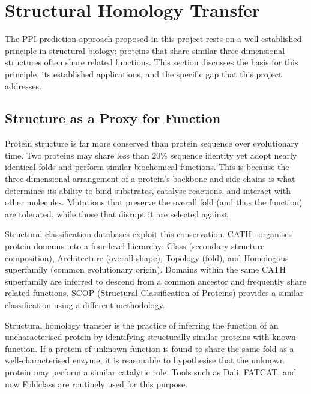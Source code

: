 \section{Structural Homology Transfer}
\label{sec:bg-homology}

The PPI prediction approach proposed in this project rests on a well-established principle in structural biology: proteins that share similar three-dimensional structures often share related functions.
This section discusses the basis for this principle, its established applications, and the specific gap that this project addresses.

\subsection{Structure as a Proxy for Function}

Protein structure is far more conserved than protein sequence over evolutionary time.
Two proteins may share less than 20\% sequence identity yet adopt nearly identical folds and perform similar biochemical functions.
This is because the three-dimensional arrangement of a protein's backbone and side chains is what determines its ability to bind substrates, catalyse reactions, and interact with other molecules.
Mutations that preserve the overall fold (and thus the function) are tolerated, while those that disrupt it are selected against.

Structural classification databases exploit this conservation.
CATH~\cite{ted_dataset} organises protein domains into a four-level hierarchy: Class (secondary structure composition), Architecture (overall shape), Topology (fold), and Homologous superfamily (common evolutionary origin).
Domains within the same CATH superfamily are inferred to descend from a common ancestor and frequently share related functions.
SCOP (Structural Classification of Proteins) provides a similar classification using a different methodology.

Structural homology transfer is the practice of inferring the function of an uncharacterised protein by identifying structurally similar proteins with known function.
If a protein of unknown function is found to share the same fold as a well-characterised enzyme, it is reasonable to hypothesise that the unknown protein may perform a similar catalytic role.
Tools such as Dali, FATCAT, and now Foldclass are routinely used for this purpose.

